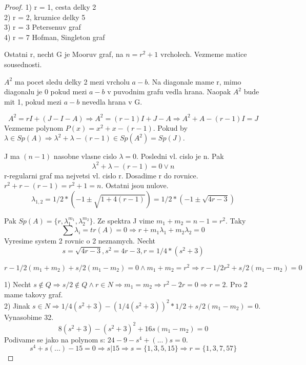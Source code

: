 \begin{proof}
	1) r = 1, cesta delky 2\\
	2) r = 2, kruznice delky 5\\
	3) r = 3 Petersenuv graf\\
	4) r = 7 Hofman, Singleton graf

	Ostatni r, necht G je Mooruv graf, na $n = r^2 + 1$ vrcholech. Vezmeme matice sousednosti.

	$A^2$ ma pocet sledu delky 2 mezi vrcholu $a - b$. Na diagonale mame r, mimo diagonalu je 0 pokud mezi $a - b$ v puvodnim grafu vedla hrana. Naopak $A^2$ bude mit 1, pokud mezi $a - b$ nevedla hrana v G.

	\[A^2 = rI + (J - I - A) \Rightarrow A^2 = (r - 1) I + J - A \Rightarrow A^2 + A - (r - 1)I = J \]
	Vezmeme polynom $P(x) = x^2 + x - (r-1)$. Pokud by $\lambda \in Sp(A) \Rightarrow \lambda^2 + \lambda - (r - 1) \in Sp(A^2) = Sp(J)$.

	J ma $(n-1)$ nasobne vlasne cislo $\lambda = 0$. Posledni vl. cislo je n. Pak
	\[ \lambda^2 + \lambda - (r - 1) = 0 \lor n \]
	r-regularni graf ma nejvetsi vl. cislo r. Dosadime r do rovnice. $ r^2 + r - (r - 1) = r^2 + 1 = n $.
	Ostatni jsou nulove.
	\[ \lambda_{1,2} = 1/2 * (-1 \pm \sqrt{1 + 4 (r-1)}) = 1/2 * (-1 \pm \sqrt{4r - 3}) \]

	Pak $ Sp(A) = \{ r, \lambda_1^{m_1}, \lambda_2^{m_2} \} $. Ze spektra J vime $m_1 + m_2 = n-1 = r^2$. Taky
	\[ \sum \lambda_i = tr(A) = 0 \Rightarrow r + m_1 \lambda_1 + m_2 \lambda_2 = 0 \]
	Vyresime system 2 rovnic o 2 neznamych. Necht
	\[s = \sqrt{4r - 3}, s^2 = 4r - 3, r = 1/4 * (s^2 + 3)\]

	\[ r -1/2 (m_1 + m_2) + s/2 (m_1 - m_2) = 0 \land m_1 + m_2 = r^2 \Rightarrow r - 1/2 r^2 + s/2 (m_1 - m_2) = 0 \]

	1) Necht $s \notin Q \Rightarrow s/2 \notin Q \land r \in N \Rightarrow m_1 = m_2 \Rightarrow r^2 - 2r = 0 \Rightarrow r = 2$. Pro 2 mame takovy graf.\\
	2) Jinak $ s \in N \Rightarrow 1/4 (s^2 + 3) - (1/4 (s^2 + 3))^2 * 1/2 + s/2 (m_1 - m_2) = 0$. Vynasobime 32.
	\[ 8(s^2 + 3) - (s^2 + 3)^2 + 16s(m_1 - m_2) = 0 \]
	Podivame se jako na polynom s: $24 - 9 - s^4 + (...) s = 0$.
	\[ s^4 + s(...) - 15 = 0 \Rightarrow s | 15 \Rightarrow s = \{ 1, 3, 5, 15 \} \Rightarrow r = \{1, 3, 7, 57 \} \]
\end{proof}
